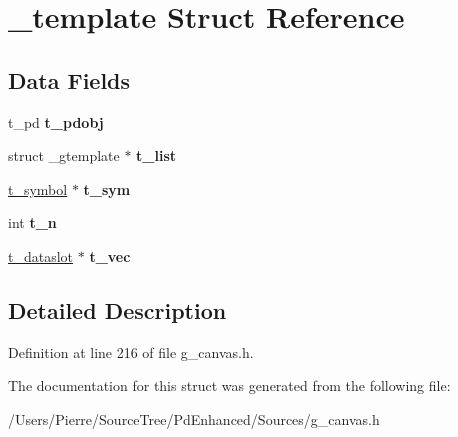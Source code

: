 \hypertarget{struct__template}{\section{\-\_\-template Struct Reference}
\label{struct__template}
}
\subsection*{Data Fields}
\begin{DoxyCompactItemize}
\item 
\hypertarget{struct__template_a523956abc441585473db1105cdd31b3b}{t\-\_\-pd {\bfseries t\-\_\-pdobj}}\label{struct__template_a523956abc441585473db1105cdd31b3b}

\item 
\hypertarget{struct__template_a64e7c8d2ea3ad17f852bf1f1102731bd}{struct \-\_\-gtemplate $\ast$ {\bfseries t\-\_\-list}}\label{struct__template_a64e7c8d2ea3ad17f852bf1f1102731bd}

\item 
\hypertarget{struct__template_a8fd73f58b60b098e93eb4dc5ae168774}{\hyperlink{struct__symbol}{t\-\_\-symbol} $\ast$ {\bfseries t\-\_\-sym}}\label{struct__template_a8fd73f58b60b098e93eb4dc5ae168774}

\item 
\hypertarget{struct__template_ab22a7280fe72a94f1db35f889292c0e4}{int {\bfseries t\-\_\-n}}\label{struct__template_ab22a7280fe72a94f1db35f889292c0e4}

\item 
\hypertarget{struct__template_a6b89c6e8e4bd81d3b82d976846f3e212}{\hyperlink{struct__dataslot}{t\-\_\-dataslot} $\ast$ {\bfseries t\-\_\-vec}}\label{struct__template_a6b89c6e8e4bd81d3b82d976846f3e212}

\end{DoxyCompactItemize}


\subsection{Detailed Description}


Definition at line 216 of file g\-\_\-canvas.\-h.



The documentation for this struct was generated from the following file\-:\begin{DoxyCompactItemize}
\item 
/\-Users/\-Pierre/\-Source\-Tree/\-Pd\-Enhanced/\-Sources/g\-\_\-canvas.\-h\end{DoxyCompactItemize}
